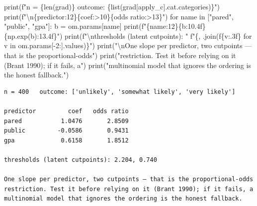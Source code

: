 \documentclass[
  letterpaper,
  10pt,
  twoside,
  openright,
  numbers=noenddot,
  chapterprefix=true]{scrbook}
\newenvironment{Shaded}{}{}
\newcommand{\BuiltInTok}[1]{\textcolor[rgb]{0.84,0.23,0.29}{#1}}
\newcommand{\CharTok}[1]{\textcolor[rgb]{0.01,0.18,0.38}{#1}}
\newcommand{\ControlFlowTok}[1]{\textcolor[rgb]{0.84,0.23,0.29}{#1}}
\newcommand{\DecValTok}[1]{\textcolor[rgb]{0.00,0.36,0.77}{#1}}
\newcommand{\KeywordTok}[1]{\textcolor[rgb]{0.84,0.23,0.29}{#1}}
\newcommand{\NormalTok}[1]{\textcolor[rgb]{0.14,0.16,0.18}{#1}}
\newcommand{\OperatorTok}[1]{\textcolor[rgb]{0.14,0.16,0.18}{#1}}
\newcommand{\SpecialCharTok}[1]{\textcolor[rgb]{0.00,0.36,0.77}{#1}}
\newcommand{\SpecialStringTok}[1]{\textcolor[rgb]{0.01,0.18,0.38}{#1}}
\newcommand{\StringTok}[1]{\textcolor[rgb]{0.01,0.18,0.38}{#1}}
\begin{document}
\begin{Shaded}
\begin{Highlighting}[]
\BuiltInTok{print}\NormalTok{(}\SpecialStringTok{f"n = }\SpecialCharTok{\{}\BuiltInTok{len}\NormalTok{(grad)}\SpecialCharTok{\}}\SpecialStringTok{   outcome: }\SpecialCharTok{\{}\BuiltInTok{list}\NormalTok{(grad[}\StringTok{\textquotesingle{}apply\_c\textquotesingle{}}\NormalTok{].cat.categories)}\SpecialCharTok{\}}\SpecialStringTok{"}\NormalTok{)}
\BuiltInTok{print}\NormalTok{(}\SpecialStringTok{f"}\CharTok{\textbackslash{}n}\SpecialCharTok{\{}\StringTok{\textquotesingle{}predictor\textquotesingle{}}\SpecialCharTok{:12\}\{}\StringTok{\textquotesingle{}coef\textquotesingle{}}\SpecialCharTok{:\textgreater{}10\}\{}\StringTok{\textquotesingle{}odds ratio\textquotesingle{}}\SpecialCharTok{:\textgreater{}13\}}\SpecialStringTok{"}\NormalTok{)}
\ControlFlowTok{for}\NormalTok{ name }\KeywordTok{in}\NormalTok{ [}\StringTok{"pared"}\NormalTok{, }\StringTok{"public"}\NormalTok{, }\StringTok{"gpa"}\NormalTok{]:}
\NormalTok{    b }\OperatorTok{=}\NormalTok{ om.params[name]}
    \BuiltInTok{print}\NormalTok{(}\SpecialStringTok{f"}\SpecialCharTok{\{}\NormalTok{name}\SpecialCharTok{:12\}\{}\NormalTok{b}\SpecialCharTok{:10.4f\}\{}\NormalTok{np}\SpecialCharTok{.}\NormalTok{exp(b)}\SpecialCharTok{:13.4f\}}\SpecialStringTok{"}\NormalTok{)}
\BuiltInTok{print}\NormalTok{(}\SpecialStringTok{f"}\CharTok{\textbackslash{}n}\SpecialStringTok{thresholds (latent cutpoints): "}
      \SpecialStringTok{f"}\SpecialCharTok{\{}\StringTok{\textquotesingle{}, \textquotesingle{}}\SpecialCharTok{.}\NormalTok{join(}\SpecialStringTok{f\textquotesingle{}}\SpecialCharTok{\{}\NormalTok{v}\SpecialCharTok{:.3f\}}\SpecialStringTok{\textquotesingle{}} \ControlFlowTok{for}\NormalTok{ v }\KeywordTok{in}\NormalTok{ om.params[}\OperatorTok{{-}}\DecValTok{2}\NormalTok{:].values)}\SpecialCharTok{\}}\SpecialStringTok{"}\NormalTok{)}
\BuiltInTok{print}\NormalTok{(}\StringTok{"}\CharTok{\textbackslash{}n}\StringTok{One slope per predictor, two cutpoints — that is the proportional{-}odds"}\NormalTok{)}
\BuiltInTok{print}\NormalTok{(}\StringTok{"restriction. Test it before relying on it (Brant 1990); if it fails, a"}\NormalTok{)}
\BuiltInTok{print}\NormalTok{(}\StringTok{"multinomial model that ignores the ordering is the honest fallback."}\NormalTok{)}
\end{Highlighting}
\end{Shaded}

\begin{verbatim}
n = 400   outcome: ['unlikely', 'somewhat likely', 'very likely']

predictor         coef   odds ratio
pared           1.0476       2.8509
public         -0.0586       0.9431
gpa             0.6158       1.8512

thresholds (latent cutpoints): 2.204, 0.740

One slope per predictor, two cutpoints — that is the proportional-odds
restriction. Test it before relying on it (Brant 1990); if it fails, a
multinomial model that ignores the ordering is the honest fallback.
\end{verbatim}
\end{document}
